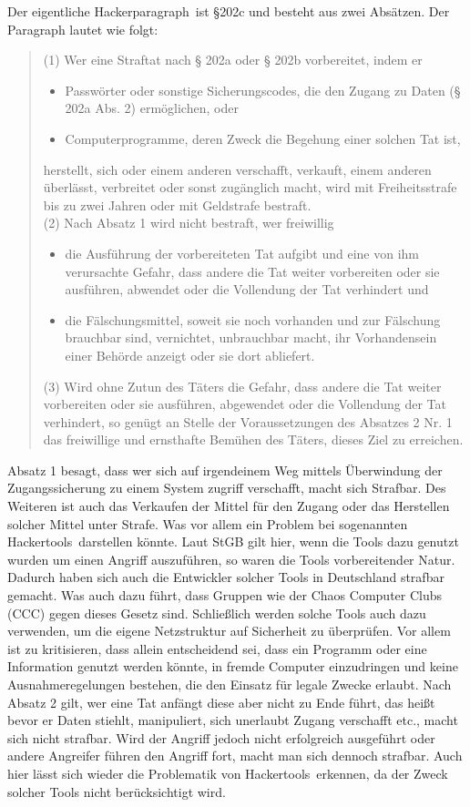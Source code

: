 \documentclass[10pt,a4paper]{article}
\begin{document}
Der eigentliche \glqq Hackerparagraph\grqq \ ist §202c und besteht aus zwei Absätzen. Der Paragraph lautet wie folgt:
\begin{quote}
(1) Wer eine Straftat nach § 202a oder § 202b vorbereitet, indem er 
\begin{itemize}
	\item[1.] Passwörter oder sonstige Sicherungscodes, die den Zugang zu Daten (§ 202a Abs. 2) ermöglichen, oder 
	\item[2.] Computerprogramme, deren Zweck die Begehung einer solchen Tat ist,
\end{itemize}
herstellt, sich oder einem anderen verschafft, verkauft, einem anderen überlässt, verbreitet oder sonst zugänglich macht, wird mit Freiheitsstrafe bis zu zwei Jahren oder mit Geldstrafe bestraft.\\
(2) Nach Absatz 1 wird nicht bestraft, wer freiwillig 
\begin{itemize}
	\item[1.] die Ausführung der vorbereiteten Tat aufgibt und eine von ihm verursachte Gefahr, dass andere die Tat weiter vorbereiten oder sie ausführen, abwendet oder die Vollendung der Tat verhindert und 
	\item[2.] die Fälschungsmittel, soweit sie noch vorhanden und zur Fälschung brauchbar sind, vernichtet, unbrauchbar macht, ihr Vorhandensein einer Behörde anzeigt oder sie dort abliefert.
\end{itemize}
(3) Wird ohne Zutun des Täters die Gefahr, dass andere die Tat weiter vorbereiten oder sie ausführen, abgewendet oder die Vollendung der Tat verhindert, so genügt an Stelle der Voraussetzungen des Absatzes 2 Nr. 1 das freiwillige und ernsthafte Bemühen des Täters, dieses Ziel zu erreichen.
\end{quote}
Absatz 1 besagt, dass wer sich auf irgendeinem Weg mittels Überwindung der Zugangssicherung zu einem System zugriff verschafft, macht sich Strafbar. Des Weiteren ist auch das Verkaufen der Mittel für den Zugang oder das Herstellen solcher Mittel unter Strafe. Was vor allem ein Problem bei sogenannten \glqq Hackertools\grqq \ darstellen könnte. Laut StGB gilt hier, wenn die Tools dazu genutzt wurden um einen Angriff auszuführen, so waren die Tools vorbereitender Natur. Dadurch haben sich auch die Entwickler solcher Tools in Deutschland strafbar gemacht. Was auch dazu führt, dass Gruppen wie der Chaos Computer Clubs (CCC) gegen dieses Gesetz sind. Schließlich werden solche Tools auch dazu verwenden, um die eigene Netzstruktur auf Sicherheit zu überprüfen. Vor allem ist zu kritisieren, dass allein entscheidend sei, dass ein Programm oder eine Information genutzt werden könnte, in fremde Computer einzudringen und keine Ausnahmeregelungen bestehen, die den Einsatz für legale Zwecke erlaubt.
Nach Absatz 2 gilt, wer eine Tat anfängt diese aber nicht zu Ende führt, das heißt bevor er Daten stiehlt, manipuliert, sich unerlaubt Zugang verschafft etc., macht sich nicht strafbar. Wird der Angriff jedoch nicht erfolgreich ausgeführt oder andere Angreifer führen den Angriff fort, macht man sich dennoch strafbar. Auch hier lässt sich wieder die Problematik von \glqq Hackertools\grqq \ erkennen, da der Zweck solcher Tools nicht berücksichtigt wird.
\end{document}
